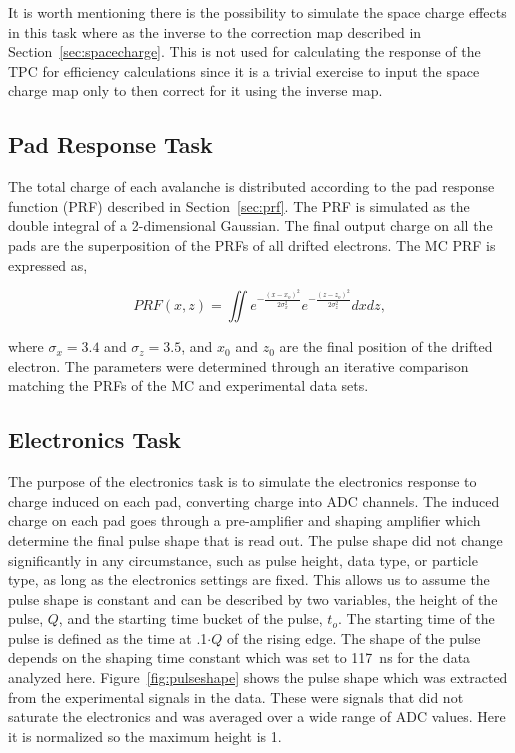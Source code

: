 It is worth mentioning there is the possibility to simulate the space charge effects in this task where as the inverse to the correction map described in Section~\ref{sec:spacecharge}. This is not used for calculating the response of the TPC for efficiency calculations since it is a trivial exercise to input the space charge map only to then correct for it using the inverse map.  

\subsection{Pad Response Task}
The total charge of each avalanche is distributed according to the pad response function (PRF) described in Section~\ref{sec:prf}. The PRF is simulated as the double integral of a 2-dimensional Gaussian. The final output charge on all the pads are the superposition of the PRFs of all drifted electrons. The MC PRF is expressed as, 

\begin{equation}
PRF(x,z) = \iint e^{-\frac{(x-x_o)^2}{2\sigma_x^2}} e^{-\frac{(z-z_o)^2}{2\sigma_z^2}}dxdz,
\end{equation}

where $\sigma_x = 3.4$ and $\sigma_z = 3.5$, and $x_0$ and $z_0$ are the final position of the drifted electron. The parameters were determined through an iterative comparison matching the PRFs of the MC and experimental data sets. 


\subsection{Electronics Task}

The purpose of the electronics task is to simulate the electronics response to charge induced on each pad, converting charge into ADC channels. The induced charge on each pad goes through a pre-amplifier and shaping amplifier which determine the final pulse shape that is read out. The pulse shape did not change significantly in any circumstance, such as pulse height, data type, or particle type, as long as the electronics settings are fixed. This allows us to assume the pulse shape is constant and can be described by two variables, the height of the pulse, $Q$, and the starting time bucket of the pulse, $t_o$. The starting time of the pulse is defined as the time at .1$\cdot Q$ of  the rising edge. The shape of the pulse depends on the shaping time constant which was set to \SI{117}{\nano\second} for the data analyzed here. Figure~\ref{fig:pulseshape} shows the pulse shape which was extracted from the experimental signals in the data. These were signals that did not saturate the electronics and was averaged over a wide range of ADC values. Here it is normalized so the maximum height is 1. 



